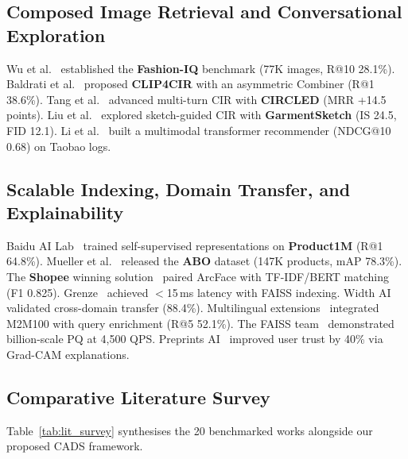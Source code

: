 \documentclass[conference]{IEEEtran}
\begin{document}
\subsection{Composed Image Retrieval and Conversational Exploration}
Wu et al.~\cite{wu2021fashioniq} established the \textbf{Fashion-IQ} benchmark (77K images, R@10 28.1\%). Baldrati et al.~\cite{baldrati2022clip4cir} proposed \textbf{CLIP4CIR} with an asymmetric Combiner (R@1 38.6\%). Tang et al.~\cite{tang2024circled} advanced multi-turn CIR with \textbf{CIRCLED} (MRR +14.5 points). Liu et al.~\cite{liu2024garmentsketch} explored sketch-guided CIR with \textbf{GarmentSketch} (IS 24.5, FID 12.1). Li et al.~\cite{li2022multitrans} built a multimodal transformer recommender (NDCG@10 0.68) on Taobao logs.

\subsection{Scalable Indexing, Domain Transfer, and Explainability}
Baidu AI Lab~\cite{baidu2021product1m} trained self-supervised representations on \textbf{Product1M} (R@1 64.8\%). Mueller et al.~\cite{mueller2022abo} released the \textbf{ABO} dataset (147K products, mAP 78.3\%). The \textbf{Shopee} winning solution~\cite{kaggle2021shopee} paired ArcFace with TF-IDF/BERT matching (F1 0.825). Grenze~\cite{grenze2024fashioniqx} achieved $<$15\,ms latency with FAISS indexing. Width AI~\cite{width2023crossdomain} validated cross-domain transfer (88.4\%). Multilingual extensions~\cite{preprint2026multilingual} integrated M2M100 with query enrichment (R@5 52.1\%). The FAISS team~\cite{faiss2023billion} demonstrated billion-scale PQ at 4{,}500 QPS. Preprints AI~\cite{preprint2024explainable} improved user trust by 40\% via Grad-CAM explanations.

\subsection{Comparative Literature Survey}
Table~\ref{tab:lit_survey} synthesises the 20 benchmarked works alongside our proposed CADS framework.
\end{document}
